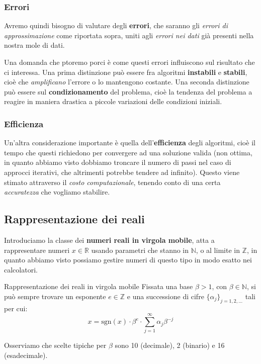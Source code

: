 \documentclass[a4paper,11pt]{article}
\begin{document}
\subsubsection{Errori}
Avremo quindi bisogno di valutare degli \textbf{errori}, che saranno gli \textit{errori di approssimazione} come riportata sopra, uniti agli \textit{errori nei dati} già presenti nella nostra mole di dati.

Una domanda che ptoremo porci è come questi errori influiscono sul risultato che ci interessa.
Una prima distinzione può essere fra algoritmi \textbf{instabili} e \textbf{stabili}, cioè che \textit{amplificano} l'errore o lo mantengono costante.
Una seconda distinzione può essere sul \textbf{condizionamento} del problema, cioè la tendenza del problema a reagire in maniera drastica a piccole variazioni delle condizioni iniziali.

\subsubsection{Efficienza}
Un'altra considerazione importante è quella dell'\textbf{efficienza} degli algoritmi, cioè il tempo che questi richiedono per convergere ad una soluzione valida (non ottima, in quanto abbiamo visto dobbiamo troncare il numero di passi nel caso di approcci iterativi, che altrimenti potrebbe tendere ad infinito).
Questo viene stimato attraverso il \textit{costo computazionale}, tenendo conto di una certa \textit{accuratezza} che vogliamo stabilire.

\subsection{Rappresentazione dei reali}
Introduciamo la classe dei \textbf{numeri reali in virgola mobile}, atta a rappresentare numeri $x \in \mathbb{R}$ usando parametri che stanno in $\mathbb{N}$, o al limite in $\mathbb{Z}$, in quanto abbiamo visto possiamo gestire numeri di questo tipo in modo esatto nei calcolatori.

\begin{theorem}{Rappresentazione dei reali in virgola mobile}	
Fissata una base $\beta > 1$, con $\beta \in \mathbb{N}$, si può sempre trovare un esponente $e \in \mathbb{Z}$ e una successione di cifre $\{\alpha_j\}_{j = 1,2, ...}$ tali per cui:
$$
x = \mathrm{sgn}(x) \cdot \beta^e \cdot \sum_{j=1}^\infty \alpha_j \beta^{-j}
$$
\end{theorem}

Osserviamo che scelte tipiche per $\beta$ sono 10 (decimale), 2 (binario) e 16 (esadecimale).
\end{document}
